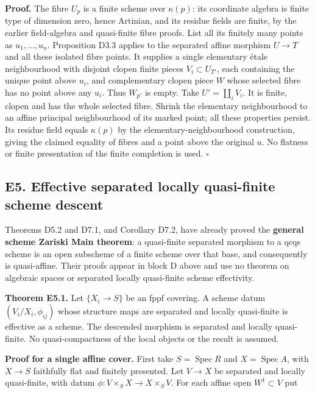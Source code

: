 \documentclass[11pt,a4paper,openany]{report}
\begin{document}
\textbf{Proof.} The fibre \(U_p\) is a finite scheme over \(\kappa(p)\): its coordinate algebra is finite type of dimension zero, hence Artinian, and its residue fields are finite, by the earlier field-algebra and quasi-finite fibre proofs. List all its finitely many points as \(u_1,\ldots,u_n\). Proposition D3.3 applies to the separated affine morphism \(U\to T\) and all these isolated fibre points. It supplies a single elementary étale neighbourhood with disjoint clopen finite pieces \(V_i\subset U_{T'}\), each containing the unique point above \(u_i\), and complementary clopen piece \(W\) whose selected fibre has no point above any \(u_i\). Thus \(W_{p'}\) is empty. Take \(U'=\coprod_iV_i\). It is finite, clopen and has the whole selected fibre. Shrink the elementary neighbourhood to an affine principal neighbourhood of its marked point; all these properties persist. Its residue field equals \(\kappa(p)\) by the elementary-neighbourhood construction, giving the claimed equality of fibres and a point above the original \(u\). No flatness or finite presentation of the finite completion is used. \(\square\)

\subsection{E5. Effective separated locally quasi-finite scheme descent}\label{AG-RG-S04-e5.-effective-separated-locally-quasi-finite-scheme-descent}

Theorems D5.2 and D7.1, and Corollary D7.2, have already proved the \textbf{general scheme Zariski Main theorem}: a quasi-finite separated morphism to a qcqs scheme is an open subscheme of a finite scheme over that base, and consequently is quasi-affine. Their proofs appear in block D above and use no theorem on algebraic spaces or separated locally quasi-finite scheme effectivity.

\textbf{Theorem E5.1.} Let \(\{X_i\to S\}\) be an fppf covering. A scheme datum \((V_i/X_i,\phi_{ij})\) whose structure maps are separated and locally quasi-finite is effective as a scheme. The descended morphism is separated and locally quasi-finite. No quasi-compactness of the local objects or the result is assumed.

\textbf{Proof for a single affine cover.} First take \(S=\operatorname{Spec}R\) and \(X=\operatorname{Spec}A\), with \(X\to S\) faithfully flat and finitely presented. Let \(V\to X\) be separated and locally quasi-finite, with datum \(\phi:V\times_S X\to X\times_S V\). For each affine open \(W^1\subset V\) put
\end{document}
